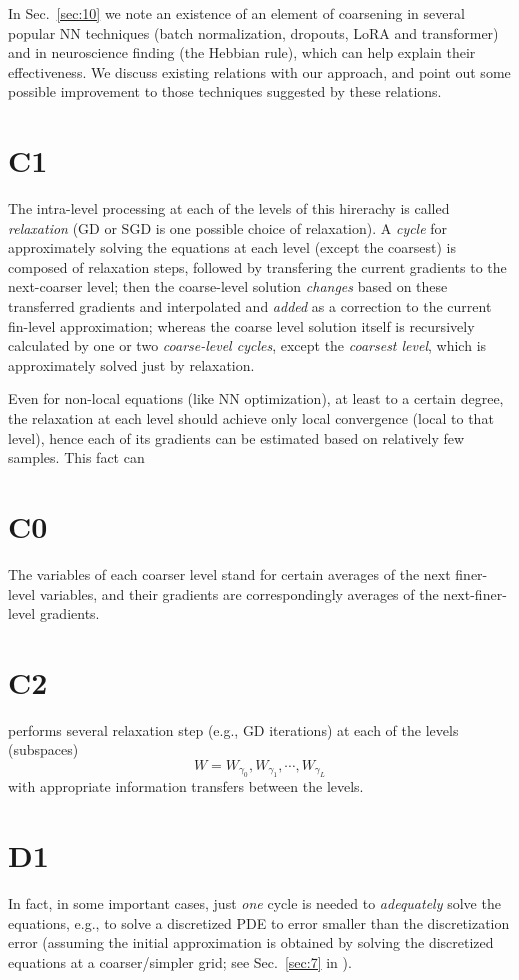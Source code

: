 \documentclass{article} %
\begin{document}
In Sec.~\ref{sec:10} we note an existence of an element of coarsening in several popular NN techniques (batch normalization, dropouts, LoRA and transformer) and in neuroscience finding (the Hebbian rule), which can help explain their effectiveness. We discuss existing relations with our approach, and point out some possible improvement to those techniques suggested by these relations.

\section{C1}
The intra-level processing at each of the levels of this hirerachy is called {\it relaxation} (GD or SGD is one possible choice of relaxation). A {\it cycle} for approximately solving the equations at each level (except the coarsest) is composed of relaxation steps, followed by transfering the current gradients to the next-coarser level; then the coarse-level solution {\it changes} based on these transferred gradients and interpolated and {\it added} as a correction to the current fin-level approximation; whereas the coarse level solution itself is recursively calculated by one or two {\it coarse-level cycles}, except the {\it coarsest level}, which is approximately solved just by relaxation.

Even for non-local equations (like NN optimization), at least to a certain degree, the relaxation at each level should achieve only local convergence (local to that level), hence each of its gradients can be estimated based on relatively few samples. This fact can

\section{C0}
The variables of each coarser level stand for certain averages of the next finer-level variables, and their gradients are correspondingly averages of the next-finer-level gradients.

\section{C2}
performs several relaxation step (e.g., GD iterations) at each of the levels (subspaces)
$$ W = W_{\gamma_0}, W_{\gamma_1}, \cdots, W_{\gamma_L} $$
with appropriate information transfers between the levels.

\section{D1}
In fact, in some important cases, just {\it one} cycle is needed to {\it adequately} solve the equations, e.g., to solve a discretized PDE to error smaller than the discretization error (assuming the initial approximation is obtained by solving the discretized equations at a coarser/simpler grid; see Sec.~\ref{sec:7} in \cite{4}).
\end{document}
